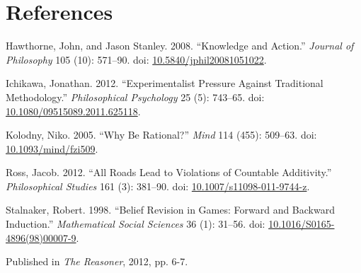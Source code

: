 \documentclass[
  11pt,
  letterpaper,
  DIV=11,
  numbers=noendperiod,
  twoside]{scrartcl}
\newlength{\cslhangindent}
\newenvironment{CSLReferences}[2] %
 {\begin{list}{}{%
  \setlength{\itemindent}{0pt}
  \setlength{\leftmargin}{0pt}
  \setlength{\parsep}{0pt}
  \ifodd #1
   \setlength{\leftmargin}{\cslhangindent}
   \setlength{\itemindent}{-1\cslhangindent}
  \fi
  \setlength{\itemsep}{#2\baselineskip}}}
 {\end{list}}
\begin{document}
\section*{References}\label{references}

\protect{}\label{refs}
\begin{CSLReferences}{1}{0}
Hawthorne, John, and Jason Stanley. 2008. {``{Knowledge and Action}.''}
\emph{Journal of Philosophy} 105 (10): 571--90. doi:
\href{https://doi.org/10.5840/jphil20081051022}{10.5840/jphil20081051022}.

Ichikawa, Jonathan. 2012. {``Experimentalist Pressure Against
Traditional Methodology.''} \emph{Philosophical Psychology} 25 (5):
743--65. doi:
\href{https://doi.org/10.1080/09515089.2011.625118}{10.1080/09515089.2011.625118}.

Kolodny, Niko. 2005. {``Why Be Rational?''} \emph{Mind} 114 (455):
509--63. doi:
\href{https://doi.org/10.1093/mind/fzi509}{10.1093/mind/fzi509}.

Ross, Jacob. 2012. {``All Roads Lead to Violations of Countable
Additivity.''} \emph{Philosophical Studies} 161 (3): 381--90. doi:
\href{https://doi.org/10.1007/s11098-011-9744-z}{10.1007/s11098-011-9744-z}.

Stalnaker, Robert. 1998. {``Belief Revision in Games: Forward and
Backward Induction.''} \emph{Mathematical Social Sciences} 36 (1):
31--56. doi:
\href{https://doi.org/10.1016/S0165-4896(98)00007-9}{10.1016/S0165-4896(98)00007-9}.

\end{CSLReferences}



\noindent Published in\emph{
The Reasoner}, 2012, pp. 6-7.
\end{document}

